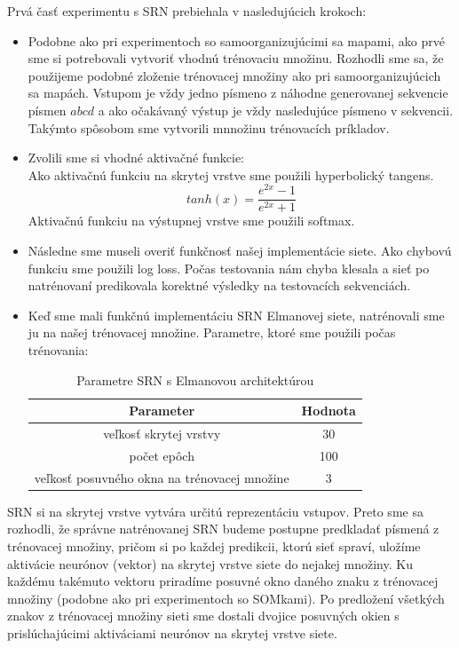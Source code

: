 Prvá časť experimentu s SRN prebiehala v nasledujúcich krokoch:
\begin{itemize}
    \item Podobne ako pri experimentoch so samoorganizujúcimi sa mapami, ako prvé sme si potrebovali vytvoriť vhodnú trénovaciu množinu.
     Rozhodli sme sa, že použijeme podobné zloženie trénovacej množiny ako pri samoorganizujúcich sa mapách.
     Vstupom je vždy jedno písmeno z náhodne generovanej sekvencie písmen $abcd$ a ako očakávaný výstup je vždy nasledujúce písmeno v sekvencii.
     Takýmto spôsobom sme vytvorili mnnožinu trénovacích príkladov.
     \item Zvolili sme si vhodné aktivačné funkcie:  \\
     Ako aktivačnú funkciu na skrytej vrstve sme použili hyperbolický tangens.
     \begin{equation}
         tanh(x) = \frac{e^{2x} - 1}{e^{2x} + 1}
     \end{equation}
     Aktivačnú funkciu na výstupnej vrstve sme použili softmax. 
     \item Následne sme museli overiť funkčnosť našej implementácie siete. Ako chybovú funkciu sme použili log loss.
    Počas testovania nám chyba klesala a sieť po natrénovaní predikovala korektné výsledky na testovacích sekvenciách.
     \item Keď sme mali funkčnú implementáciu SRN Elmanovej siete, natrénovali sme ju na našej trénovacej množine.
     Parametre, ktoré sme použili počas trénovania: \\
    \begin{table}[h!]
        \centering
        \begin{tabular}{|c|c|} 
        \hline
        Parameter & Hodnota \\ 
        \hline
        veľkosť skrytej vrstvy & 30  \\
        \hline
        počet epôch & 100  \\
        \hline
        veľkosť posuvného okna na trénovacej množine & 3  \\
        \hline
        \end{tabular}
        \caption{Parametre SRN s Elmanovou architektúrou}
        \label{table:1}
    \end{table}
\end{itemize}

SRN si na skrytej vrstve vytvára určitú reprezentáciu vstupov. Preto sme sa rozhodli, že 
správne natrénovanej SRN budeme postupne predkladať písmená z trénovacej množiny, pričom si po každej predikcii, ktorú sieť spraví,
 uložíme aktivácie neurónov (vektor) na skrytej vrstve siete do nejakej množiny. 
Ku každému takémuto vektoru priradíme posuvné okno daného znaku z trénovacej množiny (podobne ako pri experimentoch so SOMkami). 
Po predložení všetkých znakov z trénovacej množiny sieti sme dostali dvojice posuvných okien s prislúchajúcimi aktiváciami neurónov
na skrytej vrstve siete. \\

